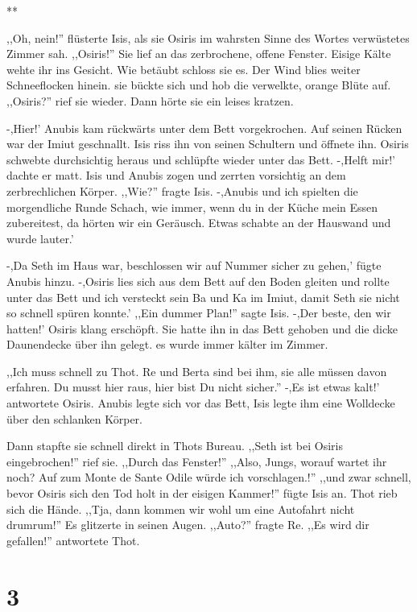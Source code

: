 \documentclass[11pt,titlepage,a5paper]{book}
\newcommand{\sterne}{\par{\centering ***\par}}
\begin{document}
\sterne

,,Oh, nein!'' flüsterte Isis, als sie Osiris im wahrsten Sinne des Wortes verwüstetes Zimmer sah. ,,Osiris!'' Sie lief an das zerbrochene, offene Fenster. Eisige Kälte wehte ihr ins Gesicht. Wie betäubt schloss sie es. Der Wind blies weiter Schneeflocken hinein. sie bückte sich und hob die verwelkte, orange Blüte auf. ,,Osiris?'' rief sie wieder. Dann hörte sie ein leises kratzen.

-,Hier!' Anubis kam rückwärts unter dem Bett vorgekrochen. Auf seinen Rücken war der Imiut geschnallt. Isis riss ihn von seinen Schultern und öffnete ihn. Osiris schwebte durchsichtig heraus und schlüpfte wieder unter das Bett. -,Helft mir!' dachte er matt. Isis und Anubis zogen und zerrten vorsichtig an dem zerbrechlichen Körper. ,,Wie?'' fragte Isis. -,Anubis und ich spielten die morgendliche Runde Schach, wie immer, wenn du in der Küche mein Essen zubereitest, da hörten wir ein Geräusch. Etwas schabte an der Hauswand und wurde lauter.'

-,Da Seth im Haus war, beschlossen wir auf Nummer sicher zu gehen,' fügte Anubis hinzu. -,Osiris lies sich aus dem Bett auf den Boden gleiten und rollte unter das Bett und ich versteckt sein Ba und Ka im Imiut, damit Seth sie nicht so schnell spüren konnte.' ,,Ein dummer Plan!'' sagte Isis. -,Der beste, den wir hatten!' Osiris klang erschöpft. Sie hatte ihn in das Bett gehoben und die dicke Daunendecke über ihn gelegt. es wurde immer kälter im Zimmer.

,,Ich muss schnell zu Thot. Re und Berta sind bei ihm, sie alle müssen davon erfahren. Du musst hier raus, hier bist Du nicht sicher.'' -,Es ist etwas kalt!' antwortete Osiris. Anubis legte sich vor das Bett, Isis legte ihm eine Wolldecke über den schlanken Körper.

Dann stapfte sie schnell direkt in Thots Bureau. ,,Seth ist bei Osiris eingebrochen!'' rief sie. ,,Durch das Fenster!'' ,,Also, Jungs, worauf wartet ihr noch? Auf zum Monte de Sante Odile würde ich vorschlagen.!'' ,,und zwar schnell, bevor Osiris sich den Tod holt in der eisigen Kammer!'' fügte Isis an. Thot rieb sich die Hände. ,,Tja, dann kommen wir wohl um eine Autofahrt nicht drumrum!'' Es glitzerte in seinen Augen. ,,Auto?'' fragte Re. ,,Es wird dir gefallen!'' antwortete Thot.

\section*{3}
\end{document}
